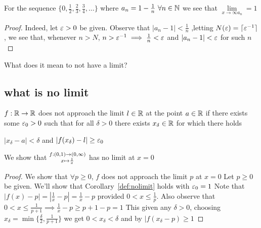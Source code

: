 \begin{example*}
    For the sequence $\{0, \frac{1}{2}, \frac{2}{3}, \frac{3}{4}, \dotsc\}$ where $a_n = 1-\frac{1}{n}\ \forall n\in\mathbb N$
    we see that $\lim\limits_{x \to \infty a_n }= 1$
\end{example*}
\begin{proof}
    Indeed, let $\varepsilon > 0$ be given. Observe that $|a_n - 1| < \frac{1}{n}$
    ,letting $N(\varepsilon) = \lceil \varepsilon^{-1}\rceil$, we see that,
    whenever $n > N$, $n > \varepsilon^{-1} \implies \frac{1}{n} < \varepsilon$ and $|a_n - 1| < \varepsilon$ for such $n$
\end{proof}

What does it mean to not have a limit?

\subsection{what is no limit}
\begin{corollary}\label{def:nolimit}
   $f: \mathbb R \rightarrow \mathbb R$ does not approach the limit $l \in \mathbb R$ at the point $a \in \mathbb R$ if
   there exists some $\varepsilon_0 > 0$ such that for all $\delta > 0$
   there exists $x_\delta \in \mathbb R$ for which there holds
   \begin{center}
       $|x_\delta - a| < \delta$ and $|f(x_\delta) - l| \geq \varepsilon_0$
   \end{center}
\end{corollary}

\begin{example*}
    We show that $\substack{f:(0, 1)\rightarrow (0, \infty)\\
    x\mapsto \frac{1}{x}}$ has no limit at $x=0$
\end{example*}
\begin{proof}
    We show that $\forall p \geq 0$, $f$ does not approach the limit $p$ at $x=0$
    Let $p \geq 0$ be given. We'll show that Corollary~\ref{def:nolimit} holds with $\varepsilon_0 = 1$
    Note that $|f(x)-p| = |\frac{1}{x}-p|=\frac{1}{x} - p$ provided $0 < x \leq \frac{1}{p}$.
    Also observe that $0 < x \leq \frac{1}{p+1} \implies \frac{1}{x} - p \geq p+1-p=1$
    This given any $\delta > 0$, choosing $x_\delta=\min\{\frac{\delta}{2},\frac{1}{p+1}\}$
    we get $0 < x_\delta < \delta$ and by $|f(x_\delta - p) \geq 1$
\end{proof}

